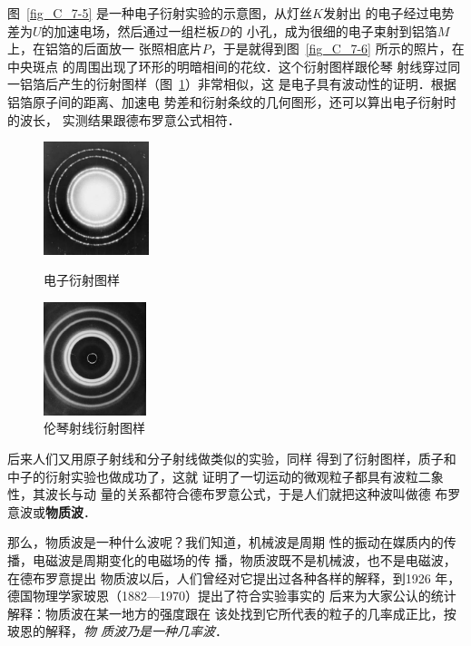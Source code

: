图~\ref{fig_C_7-5} 是一种电子衍射实验的示意图，从灯丝$K$发射出
的电子经过电势差为$U$的加速电场，然后通过一组栏板$D$的
小孔，成为很细的电子束射到铝箔$M$上，在铝箔的后面放一
张照相底片$P$，于是就得到图~\ref{fig_C_7-6} 所示的照片，在中央斑点
的周围出现了环形的明暗相间的花纹．这个衍射图样跟伦琴
射线穿过同一铝箔后产生的衍射图样（图~\ref{fig_C_7-7}）非常相似，这
是电子具有波动性的证明．根据铝箔原子间的距离、加速电
势差和衍射条纹的几何图形，还可以算出电子衍射时的波长，
实测结果跟德布罗意公式相符．
\begin{figure}[htbp]
    \centering
    \begin{minipage}[t]{0.48\textwidth}
        \centering
        \includegraphics[height=3.3cm]{fig/C/7-6.jpg}
        \caption{电子衍射图样}\label{fig_C_7-6}
    \end{minipage}
    \begin{minipage}[t]{0.48\textwidth}
        \centering
        \includegraphics[height=3.3cm]{fig/C/7-7.jpg}
        \caption{伦琴射线衍射图样}\label{fig_C_7-7}
    \end{minipage}
\end{figure}


后来人们又用原子射线和分子射线做类似的实验，同样
得到了衍射图样，质子和中子的衍射实验也做成功了，这就
证明了一切运动的微观粒子都具有波粒二象性，其波长与动
量的关系都符合德布罗意公式，于是人们就把这种波叫做德
布罗意波或\textbf{物质波}．

那么，物质波是一种什么波呢？我们知道，机械波是周期
性的振动在媒质内的传播，电磁波是周期变化的电磁场的传
播，物质波既不是机械波，也不是电磁波，在德布罗意提出
物质波以后，人们曾经对它提出过各种各样的解释，到1926
年，德国物理学家玻恩（1882—1970）提出了符合实验事实的
后来为大家公认的统计解释：物质波在某一地方的强度跟在
该处找到它所代表的粒子的几率成正比，按玻恩的解释，\textit{物
质波乃是一种几率波}．

